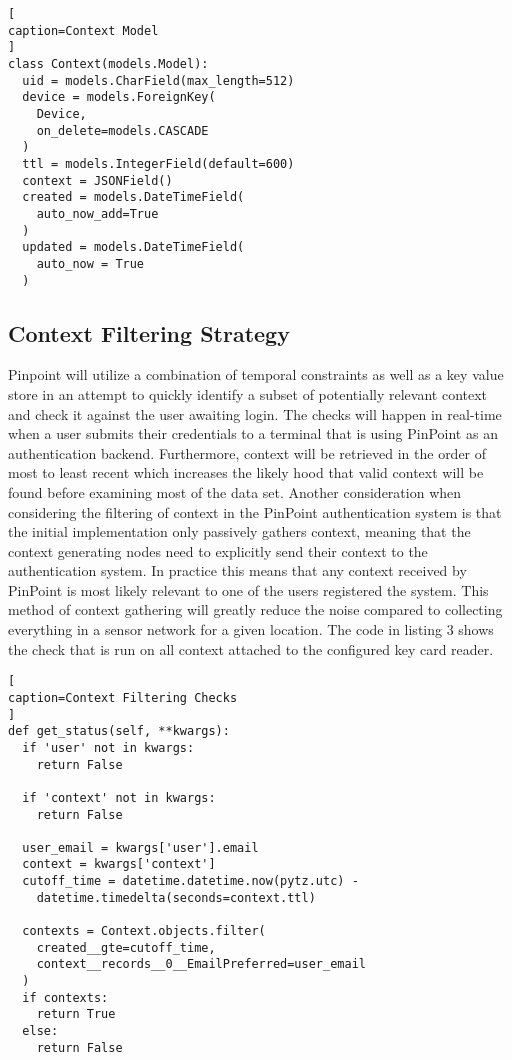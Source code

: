 \documentclass[11pt,journal]{IEEEtran}
\begin{document}
\begin{lstlisting}[
caption=Context Model
]
class Context(models.Model):
  uid = models.CharField(max_length=512)
  device = models.ForeignKey(
  	Device, 
  	on_delete=models.CASCADE
  )
  ttl = models.IntegerField(default=600)
  context = JSONField()
  created = models.DateTimeField(
  	auto_now_add=True
  )
  updated = models.DateTimeField(
  	auto_now = True
  )
\end{lstlisting}


\subsection{Context Filtering Strategy}
Pinpoint will utilize a combination of temporal constraints as well as a key value store in an attempt to quickly identify a subset of potentially relevant context and check it against the user awaiting login.  The checks will happen in real-time when a user submits their credentials to a terminal that is using PinPoint as an authentication backend.  Furthermore, context will be retrieved in the order of most to least recent which increases the likely hood that valid context will be found before examining most of the data set.  Another consideration when considering the filtering of context in the PinPoint authentication system is that the initial implementation only passively gathers context, meaning that the context generating nodes need to explicitly send their context to the authentication system.  In practice this means that any context received by PinPoint is most likely relevant to one of the users registered the system.  This method of context gathering will greatly reduce the noise compared to collecting everything in a sensor network for a given location.  The code in listing 3 shows the check that is run on all context attached to the configured key card reader.

\begin{lstlisting}[
caption=Context Filtering Checks
]
def get_status(self, **kwargs):
  if 'user' not in kwargs:
    return False

  if 'context' not in kwargs:
    return False

  user_email = kwargs['user'].email
  context = kwargs['context']
  cutoff_time = datetime.datetime.now(pytz.utc) - 
    datetime.timedelta(seconds=context.ttl)

  contexts = Context.objects.filter(
    created__gte=cutoff_time, 
    context__records__0__EmailPreferred=user_email
  )
  if contexts:
    return True
  else:
    return False

\end{lstlisting}
\end{document}
